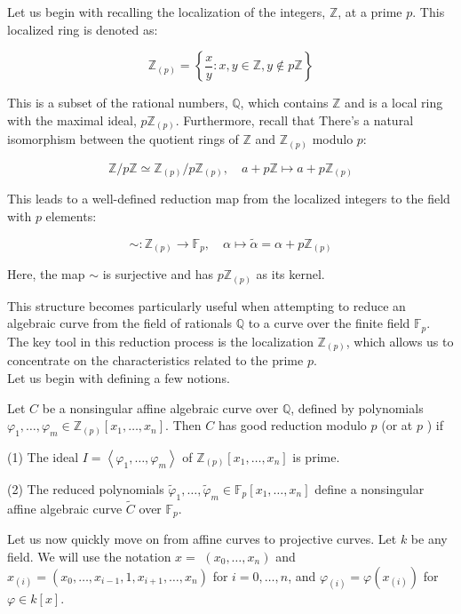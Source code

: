 Let us begin with recalling the localization of the integers, \( \mathbb{Z} \), at a prime \( p \). This localized ring is denoted as:

\[
\mathbb{Z}_{(p)} = \left\{ \frac{x}{y} : x, y \in \mathbb{Z}, y \notin p\mathbb{Z} \right\}
\]

This is a subset of the rational numbers, \( \mathbb{Q} \), which contains \( \mathbb{Z} \) and is a local ring with the maximal ideal, \( p\mathbb{Z}_{(p)} \). Furthermore, recall that  
There's a natural isomorphism between the quotient rings of \( \mathbb{Z} \) and \( \mathbb{Z}_{(p)} \) modulo \( p \):

\[
\mathbb{Z} / p\mathbb{Z} \simeq \mathbb{Z}_{(p)} / p\mathbb{Z}_{(p)}, \quad a + p\mathbb{Z} \mapsto a + p\mathbb{Z}_{(p)}
\]

This leads to a well-defined reduction map from the localized integers to the field with \( p \) elements:

\[
\sim: \mathbb{Z}_{(p)} \to \mathbb{F}_{p}, \quad \alpha \mapsto \tilde{\alpha} = \alpha + p\mathbb{Z}_{(p)}
\]

Here, the map \( \sim \) is surjective and has \( p\mathbb{Z}_{(p)} \) as its kernel.

This structure becomes particularly useful when attempting to reduce an algebraic curve from the field of rationals \( \mathbb{Q} \) to a curve over the finite field \( \mathbb{F}_{p} \). The key tool in this reduction process is the localization \( \mathbb{Z}_{(p)} \), which allows us to concentrate on the characteristics related to the prime \( p \).\\

Let us begin with defining a few notions. 
\begin{definition}
    Let $C$ be a nonsingular affine algebraic curve over $\mathbb{Q}$, defined by polynomials $\varphi_{1}, \ldots, \varphi_{m} \in \mathbb{Z}_{(p)}\left[x_{1}, \ldots, x_{n}\right]$. Then $C$ has good reduction modulo $p$ (or at $p$ ) if

(1) The ideal $I=\left\langle\varphi_{1}, \ldots, \varphi_{m}\right\rangle$ of $\mathbb{Z}_{(p)}\left[x_{1}, \ldots, x_{n}\right]$ is prime.

(2) The reduced polynomials $\tilde{\varphi}_{1}, \ldots, \tilde{\varphi}_{m} \in \mathbb{F}_{p}\left[x_{1}, \ldots, x_{n}\right]$ define a nonsingular affine algebraic curve $\widetilde{C}$ over $\mathbb{F}_{p}$.
\end{definition}
Let us now quickly move on from affine curves to projective curves. Let $k$ be any field. We will use the notation $x=$ $\left(x_{0}, \ldots, x_{n}\right)$ and $x_{(i)}=\left(x_{0}, \ldots, x_{i-1}, 1, x_{i+1}, \ldots, x_{n}\right)$ for $i=0, \ldots, n$, and $\varphi_{(i)}=\varphi\left(x_{(i)}\right)$ for $\varphi \in k[x]$. 

